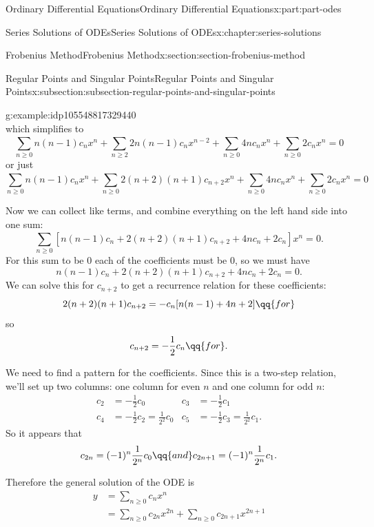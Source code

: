 \documentclass[twoside,10pt,]{book}
\numberwithin{equation}{part}
\newcommand{\amp}{&}
\begin{document}
\begin{partptx}{Ordinary Differential Equations}{}{Ordinary Differential Equations}{}{}{x:part:part-odes}
\begin{chapterptx}{Series Solutions of ODEs}{}{Series Solutions of ODEs}{}{}{x:chapter:series-solutions}
\begin{sectionptx}{Frobenius Method}{}{Frobenius Method}{}{}{x:section:section-frobenius-method}
\begin{subsectionptx}{Regular Points and Singular Points}{}{Regular Points and Singular Points}{}{}{x:subsection:subsection-regular-points-and-singular-points}
\begin{example}{}{g:example:idp105548817329440}
\begin{equation*}
\end{equation*}
which simplifies to%
\begin{equation*}
\sum_{n\geq0}^{}n(n-1)c_{n}x^{n}+\sum_{n\geq2}^{}2n(n-1)c_{n}x^{n-2}+\sum_{n\geq0}^{}4nc_{n}x^{n}+\sum_{n\geq0}^{}2c_{n}x^{n} = 0
\end{equation*}
or just%
\begin{equation*}
\sum_{n\geq0}^{}n(n-1)c_{n}x^{n}+\sum_{n\geq0}^{}2(n+2)(n+1)c_{n+2}x^{n}+\sum_{n\geq0}^{}4nc_{n}x^{n}+\sum_{n\geq0}^{}2c_{n}x^{n} = 0
\end{equation*}
%
\par
Now we can collect like terms, and combine everything on the left hand side into one sum:%
\begin{equation*}
\sum_{n\geq0}^{}\left[n(n-1)c_{n}+2(n+2)(n+1)c_{n+2}+4nc_{n}+2c_{n}\right]x^{n} = 0.
\end{equation*}
For this sum to be \(0\) each of the coefficients must be \(0\), so we must have%
\begin{equation*}
n(n-1)c_{n}+2(n+2)(n+1)c_{n+2}+4nc_{n}+2c_{n} = 0.
\end{equation*}
We can solve this for \(c_{n+2}\) to get a recurrence relation for these coefficients:%
\begin{equation*}
2(n+2)(n+1)c_{n+2} = -c_{n}[n(n-1)+4n+2] \qq{for }
\end{equation*}
so%
\begin{equation*}
c_{n+2} = -\frac{1}{2}c_{n}\qq{for }.
\end{equation*}
%
\par
We need to find a pattern for the coefficients. Since this is a two-step relation, we'll set up two columns: one column for even \(n\) and one column for odd \(n\):%
\begin{align*}
c_{2} \amp= -\frac{1}{2}c_{0} \amp c_{3} \amp= -\frac{1}{2}c_{1}\\
c_{4} \amp= -\frac{1}{2}c_{2} = \frac{1}{2^{2}}c_{0} \amp c_{5} \amp= -\frac{1}{2}c_{3} = \frac{1}{2^{2}}c_{1}\text{.}
\end{align*}
So it appears that%
\begin{equation*}
c_{2n} = (-1)^{n}\frac{1}{2^{n}}c_{0}\qq{and}c_{2n+1} = (-1)^{n}\frac{1}{2^{n}}c_{1}\text{.}
\end{equation*}
%
\par
Therefore the general solution of the ODE is%
\begin{align*}
y \amp= \sum_{n\geq0}^{}c_{n}x^{n}\\
\amp= \sum_{n\geq0}c_{2n}x^{2n} + \sum_{n\geq0}c_{2n+1}x^{2n+1}\\

\end{align*}
\end{example}
\end{subsectionptx}
\end{sectionptx}
\end{chapterptx}
\end{partptx}
\end{document}
